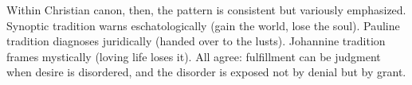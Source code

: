 Within Christian canon, then, the pattern is consistent but variously emphasized. Synoptic
tradition warns eschatologically (gain the world, lose the soul). Pauline tradition diagnoses
juridically (handed over to the lusts). Johannine tradition frames mystically (loving life
loses it). All agree: fulfillment can be judgment when desire is disordered, and the disorder
is exposed not by denial but by grant.
